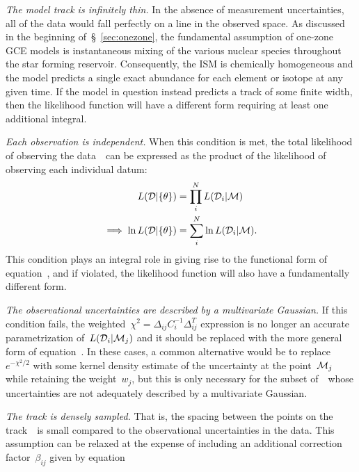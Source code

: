 \documentclass[ms.tex]{subfiles}
\begin{document}
\par
\textit{The model track is infinitely thin.}
In the absence of measurement uncertainties, all of the data would fall
perfectly on a line in the observed space.
As discussed in the beginning of~\S~\ref{sec:onezone}, the fundamental
assumption of one-zone GCE models is instantaneous mixing of the various
nuclear species throughout the star forming reservoir.
Consequently, the ISM is chemically homogeneous and the model predicts a single
exact abundance for each element or isotope at any given time.
If the model in question instead predicts a track of some finite width, then
the likelihood function will have a different form requiring at least one
additional integral.
\par
\textit{Each observation is independent.}
When this condition is met, the total likelihood of observing the
data~~can be expressed as the product of the likelihood of observing
each individual datum:
\begin{subequations}\begin{align}
L(\mathcal{D} | \{\theta\}) &= \prod_i^N L(\mathcal{D}_i | \mathcal{M})
\\
\implies \ln L(\mathcal{D} | \{\theta\}) &= \sum_i^N \ln
L(\mathcal{D}_i | \mathcal{M}).
\end{align}\end{subequations}
This condition plays an integral role in giving rise to the functional form of
equation~, and if violated, the likelihood function will
also have a fundamentally different form.
\par
\textit{The observational uncertainties are described by a multivariate
Gaussian.}
If this condition fails, the weighted~$\chi^2 = \Delta_{ij}C_i^{-1}\Delta_{ij}^T$
expression is no longer an accurate parametrization of~$L(\mathcal{D}_i |
\mathcal{M}_j)$ and it should be replaced with the more general form of
equation~.
In these cases, a common alternative would be to replace~$e^{-\chi^2 / 2}$ with
some kernel density estimate of the uncertainty at the point~$\mathcal{M}_j$
while retaining the weight~$w_j$, but this is only necessary for the subset
of~~whose uncertainties are not adequately described by a
multivariate Gaussian.
\par
\textit{The track is densely sampled.}
That is, the spacing between the points on the track~~is small
compared to the observational uncertainties in the data.
This assumption can be relaxed at the expense of including an additional
correction factor~$\beta_{ij}$ given by equation~
\end{document}
